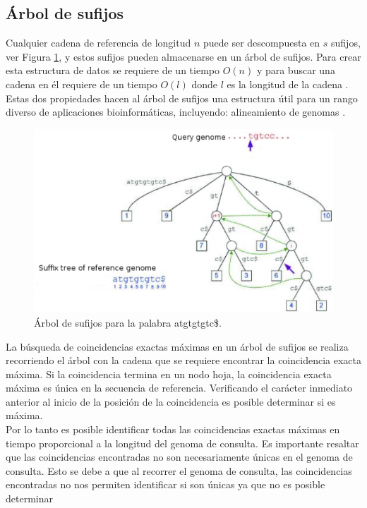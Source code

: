 \documentclass[12pt,a4paper]{article}
\begin{document}
\subsection{Árbol de sufijos}
\indent
 Cualquier cadena de referencia de longitud $n$ puede ser descompuesta en $s$ sufijos, ver
 Figura \ref{fig:st}, y estos sufijos pueden almacenarse en un árbol de sufijos.
 Para crear esta estructura de datos se requiere de un tiempo $O(n)$ y para
 buscar una cadena en él requiere de un tiempo $O(l)$ donde $l$ es la longitud
 de la cadena \cite{Gusfield2007Algorithms}. Estas dos propiedades hacen al árbol
 de sufijos una estructura útil para un rango diverso de aplicaciones
 bioinformáticas, incluyendo: alineamiento de genomas \cite{Mummer3}.\\
  \begin{figure}[h] 
   \centering 
   \includegraphics[scale=0.8]{st-mum.png} 
   \caption{Árbol de sufijos para la palabra atgtgtgtc\$.} 
   \label{fig:st} 
 \end{figure}
\indent
La búsqueda de coincidencias exactas máximas en un árbol de sufijos se realiza recorriendo el árbol
con la cadena que se requiere encontrar la coincidencia exacta máxima. Si la coincidencia termina en 
un nodo hoja, la coincidencia exacta máxima es única en la secuencia de referencia. Verificando el 
carácter inmediato anterior al inicio de la posición de la coincidencia es posible determinar si es
máxima.\\
\indent
Por lo tanto es posible identificar todas las coincidencias exactas máximas en tiempo proporcional a
la longitud del genoma de consulta. Es importante resaltar que las coincidencias encontradas no son
necesariamente únicas en el genoma de consulta. Esto se debe a que al recorrer el genoma de consulta, 
las coincidencias encontradas no nos permiten identificar si son únicas ya que no es posible determinar
\end{document}

